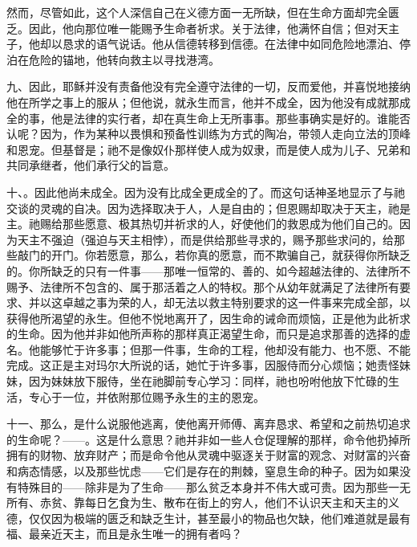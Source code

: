 然而，尽管如此，这个人深信自己在义德方面一无所缺，但在生命方面却完全匮乏。因此，他向那位唯一能赐予生命者祈求。关于法律，他满怀自信；但对天主子，他却以恳求的语气说话。他从信德转移到信德。在法律中如同危险地漂泊、停泊在危险的锚地，他转向救主以寻找港湾。\par

九、因此，耶稣并没有责备他没有完全遵守法律的一切，反而爱他，并喜悦地接纳他在所学之事上的服从；但他说，就永生而言，他并不成全，因为他没有成就那成全的事，他是法律的实行者，却在真生命上无所事事。那些事确实是好的。谁能否认呢？因为，作为某种以畏惧和预备性训练为方式的陶冶，带领人走向立法的顶峰和恩宠。但基督是；祂不是像奴仆那样使人成为奴隶，而是使人成为儿子、兄弟和共同承继者，他们承行父的旨意。\par

十、。因此他尚未成全。因为没有比成全更成全的了。而这句话神圣地显示了与祂交谈的灵魂的自决。因为选择取决于人，人是自由的；但恩赐却取决于天主，祂是主。祂赐给那些愿意、极其热切并祈求的人，好使他们的救恩成为他们自己的。因为天主不强迫（强迫与天主相悖），而是供给那些寻求的，赐予那些求问的，给那些敲门的开门。你若愿意，那么，若你真的愿意，而不欺骗自己，就获得你所缺乏的。你所缺乏的只有一件事——那唯一恒常的、善的、如今超越法律的、法律所不赐予、法律所不包含的、属于那活着之人的特权。那个从幼年就满足了法律所有要求、并以这卓越之事为荣的人，却无法以救主特别要求的这一件事来完成全部，以获得他所渴望的永生。但他不悦地离开了，因生命的诫命而烦恼，正是他为此祈求的生命。因为他并非如他所声称的那样真正渴望生命，而只是追求那善的选择的虚名。他能够忙于许多事；但那一件事，生命的工程，他却没有能力、也不愿、不能完成。这正是主对玛尔大所说的话，她忙于许多事，因服侍而分心烦恼；她责怪妹妹，因为妹妹放下服侍，坐在祂脚前专心学习：同样，祂也吩咐他放下忙碌的生活，专心于一位，并依附那位赐予永生的主的恩宠。\par

十一、那么，是什么说服他逃离，使他离开师傅、离弃恳求、希望和之前热切追求的生命呢？——。这是什么意思？祂并非如一些人仓促理解的那样，命令他扔掉所拥有的财物、放弃财产；而是命令他从灵魂中驱逐关于财富的观念、对财富的兴奋和病态情感，以及那些忧虑——它们是存在的荆棘，窒息生命的种子。因为如果没有特殊目的——除非是为了生命——那么贫乏本身并不伟大或可贵。因为那些一无所有、赤贫、靠每日乞食为生、散布在街上的穷人，他们不认识天主和天主的义德，仅仅因为极端的匮乏和缺乏生计，甚至最小的物品也欠缺，他们难道就是最有福、最亲近天主，而且是永生唯一的拥有者吗？\par

